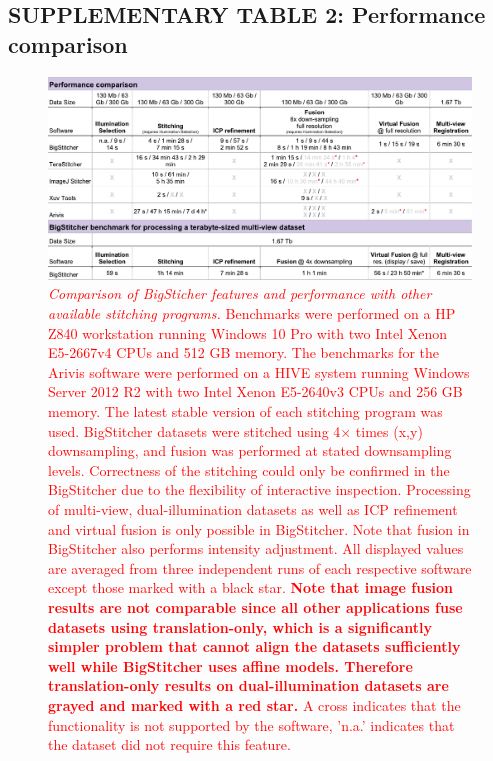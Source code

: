 \documentclass[]{spie}  %
\def\red{\textcolor{red}}
\begin{document}
\begin{landscape}
\subsection*{SUPPLEMENTARY TABLE 2: Performance comparison}
\begin{figure}[h!]
\center\includegraphics[width=\textwidth+5.00cm]{supp_table_1.pdf}
\vspace{0.5mm}
\caption{\hspace{-0.5mm} \red{\emph{Comparison of BigSticher features and performance with other available stitching programs.} Benchmarks were performed on a HP Z840 workstation running Windows 10 Pro with two Intel Xenon E5-2667v4 CPUs and 512 GB memory. The benchmarks for the Arivis software were performed on a HIVE system running Windows Server 2012 R2 with two Intel Xenon E5-2640v3 CPUs and 256 GB memory. The latest stable version of each stitching program was used. BigStitcher datasets were stitched using 4$\times$ times (x,y) downsampling, and fusion was performed at stated downsampling levels. Correctness of the stitching could only be confirmed in the BigStitcher due to the flexibility of interactive inspection. Processing of multi-view, dual-illumination datasets as well as ICP refinement and virtual fusion is only possible in BigStitcher. Note that fusion in BigStitcher also performs intensity adjustment. All displayed values are averaged from three independent runs of each respective software except those marked with a black star. \textbf{Note that image fusion results are not comparable since all other applications fuse datasets using translation-only, which is a significantly simpler problem that cannot align the datasets sufficiently well while BigStitcher uses affine models. Therefore translation-only results on dual-illumination datasets are grayed and marked with a red star.} A cross indicates that the functionality is not supported by the software, 'n.a.' indicates that the dataset did not require this feature.}
}
\label{tab:benchmarks}
\end{figure}

\end{landscape}
\pagebreak
\end{document}
